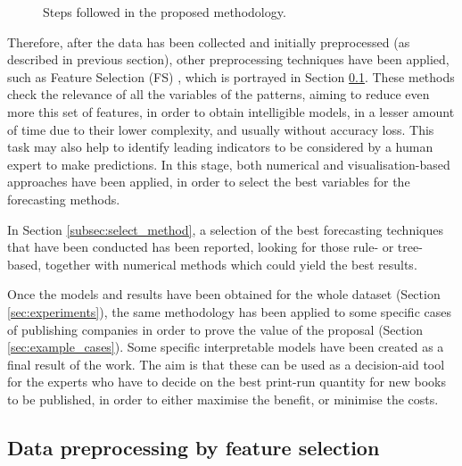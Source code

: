 \documentclass[a4paper,10pt,twocolumn,preprint,3p]{elsarticle}
\begin{document}
\begin{figure}[!ht] 
\begin{center}
\caption{Steps followed in the proposed methodology.}
\label{fig:methodology}
\end{center}
\end{figure}


Therefore, after the data has been collected and initially preprocessed (as described in previous section), other preprocessing techniques have been applied, such as Feature Selection (FS) \cite{kittler1986feature}, which is portrayed in Section \ref{subsec:data_preproces}. These methods check the relevance of all the variables of the patterns, aiming to reduce even more this set of features, in order to obtain intelligible models, in a lesser amount of time due to their lower complexity, and usually without accuracy loss.
This task may also help to identify leading indicators to be considered 
by a human expert to make predictions.
In this stage, both numerical and visualisation-based approaches have been 
applied, in order to select the best variables for the forecasting methods.  

In Section \ref{subsec:select_method}, a selection of the best forecasting techniques that have been conducted has been reported, looking for those rule- or tree-based, together with numerical methods which could yield the best results. 

Once the models and results have been obtained for the whole dataset (Section \ref{sec:experiments}), the same methodology has been applied to some specific cases of publishing companies in order to prove the value of the proposal (Section \ref{sec:example_cases}).
Some specific interpretable models have been created as a final result of the work. The aim is that these can be used as a decision-aid tool for the experts who have to decide on the best print-run quantity for new books to be published, in order to either maximise the benefit, or minimise the costs.



\subsection{Data preprocessing by feature selection}
\label{subsec:data_preproces}
\end{document}
